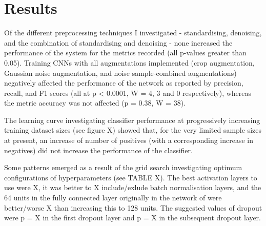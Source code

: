 \documentclass[11pt]{article}
\begin{document}
\section{Results}

Of the different preprocessing techniques I investigated - standardising, denoising, and the combination of standardising and denoising - none increased the performance of the system for the metrics recorded (all p-values greater than 0.05). Training CNNs with all augmentations implemented (crop augmentation, Gaussian noise augmentation, and noise sample-combined augmentations) negatively affected the performance of the network as reported by precision, recall, and F1 scores (all at p < 0.0001, W = 4, 3 and 0 respectively), whereas the metric accuracy was not affected (p = 0.38, W = 38).   

The learning curve investigating classifier performance at progressively increasing training dataset sizes (see figure X) showed that, for the very limited sample sizes at present, an increase of number of positives (with a corresponding increase in negatives) did not increase the performance of the classifier.

Some patterns emerged as a result of the grid search investigating optimum configurations of hyperparameters (see TABLE X). The best activation layers to use were X, it was better to X include/exlude batch normalisation layers, and the 64 units in the fully connected layer originally in the network of \citep{salamon2017deep} were better/worse X than increasing this to 128 units. The suggested values of dropout were p = X in the first dropout layer and p = X in the subsequent dropout layer.
\end{document}
